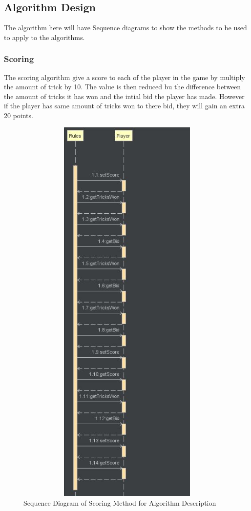 \subsection{Algorithm Design}
The algorithm here will have Sequence diagrams to show the methods to be used to apply to the algorithms.
\subsubsection{Scoring}
The scoring algorithm give a score to each of the player in the game by multiply the amount of trick by 10. The value is then reduced bu the difference between the amount of tricks it has won and the intial bid the player has made. However if the player has same amount of tricks won to there bid, they will gain an extra 20 points.
\begin{figure}
\centering
\includegraphics[width=15cm ,height=20cm,keepaspectratio]{ScoringSequenceDiagram}
\caption{Sequence Diagram of Scoring Method for Algorithm Description}
\label{fig:Scoring}
\end{figure}
